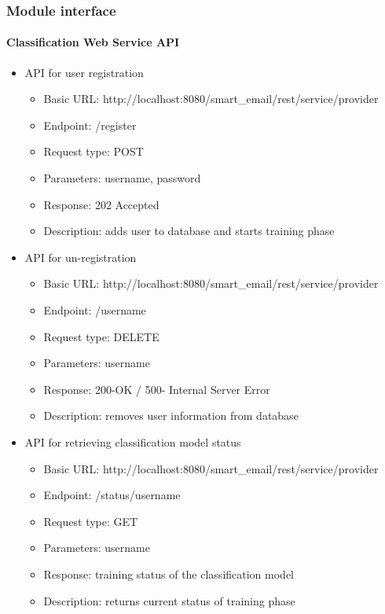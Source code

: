 \subsubsection{Module interface}
\paragraph{Classification Web Service API}
	\begin{itemize}
		\item API for user registration
		\begin{itemize}
			\item Basic URL: http://localhost:8080/smart\_email/rest/service/provider		
			\item Endpoint: /register
			\item Request type: POST
			\item Parameters: username, password
			\item Response: 202 Accepted
			\item Description: adds user to database and starts training phase
		\end{itemize}

		\item API for un-registration
		\begin{itemize}
			\item Basic URL: http://localhost:8080/smart\_email/rest/service/provider		
			\item Endpoint: /username
			\item Request type: DELETE
			\item Parameters: username
			\item Response: 200-OK / 500- Internal Server Error
			\item Description: removes user information from database
		\end{itemize}

		\item API for retrieving classification model status
		\begin{itemize}
			\item Basic URL: http://localhost:8080/smart\_email/rest/service/provider		
			\item Endpoint: /status/username
			\item Request type: GET
			\item Parameters: username
			\item Response: training status of the classification model
			\item Description: returns current status of training phase
		\end{itemize}


\end{itemize}
